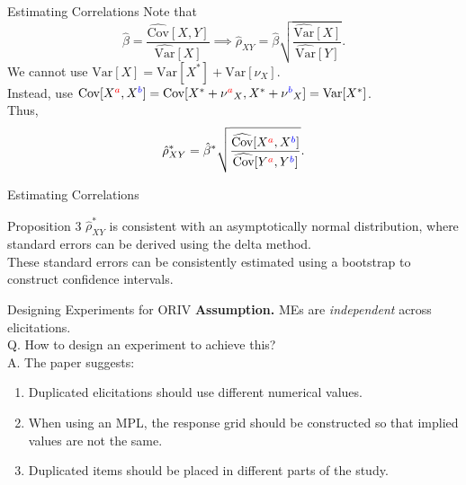\begin{frame}{Estimating Correlations}
    Note that
    \begin{equation*}
        \hat{\beta} = \frac{\widehat{\text{Cov}}[X,Y]}{\widehat{\text{Var}}[X]}
        \implies
        \hat{\rho}_{XY} = \hat{\beta} \sqrt{\frac{\widehat{\text{Var}}[X]}{\widehat{\text{Var}}[Y]}}.
    \end{equation*}
    We cannot use $\text{Var}[X] = \text{Var}[X^{*}] + \text{Var}[\nu_{X}]$.\\
    \vspace{3mm}
    Instead, use $\text{Cov}[X^{\color{red}a},X^{\color{blue}b}] = \text{Cov}[X^{*}+\nu^{\color{red}a}_{X}, X^{*}+\nu^{\color{blue}b}_{X}] = \text{Var}[X^{*}]$.\\
    Thus,
    \begin{equation*}
        \hat{\rho}^{*}_{XY} = \hat{\beta}^{*} \sqrt{\frac{\widehat{\text{Cov}}[X^{\color{red}a},X^{\color{blue}b}]}{\widehat{\text{Cov}}[Y^{\color{red}a},Y^{\color{blue}b}]}}.
    \end{equation*}
\end{frame}

\begin{frame}{Estimating Correlations}
    \begin{block}{Proposition 3}
        $\hat{\rho}_{XY}^{*}$ is consistent with an asymptotically normal distribution, where standard errors can be derived using the delta method. \\
        \vspace{3mm}
        These standard errors can be consistently estimated using a bootstrap to construct confidence intervals.
    \end{block}
\end{frame}

\begin{frame}{Designing Experiments for ORIV}
    \textbf{Assumption.} MEs are {\color{red}\textit{independent}} across elicitations.\\
    \vspace{3mm}
    {\color{blue}Q. How to design an experiment to achieve this?}\\
    \vspace{3mm}
    A. The paper suggests:
    \begin{enumerate}
        \item Duplicated elicitations should use different numerical values.
        \item When using an MPL, the response grid should be constructed so that implied values are not the same.
        \item Duplicated items should be placed in different parts of the study.
    \end{enumerate}
\end{frame}

